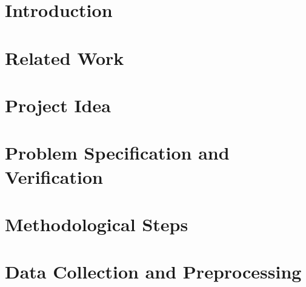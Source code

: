 \documentclass[a4paper, 12pt, oneside]{book}
\begin{document}
\tableofcontents
\thispagestyle{empty}
\clearpage

\thispagestyle{empty}
\printnoidxglossary[type=\acronymtype,title=Acronyms,nonumberlist]
\newpage 
\listoffigures
{}
\clearpage



% 

\chapter{Introduction} \label{chap:introduction}


\chapter{Related Work} \label{chap:related-work}


\chapter{Project Idea} \label{chap:project-ideas}


\chapter{Problem Specification and Verification}\label{chap:problem-spec}


\chapter{Methodological Steps} \label{chap:methodology}


\chapter{Data Collection and Preprocessing}\label{chap:Data}


\end{document}
